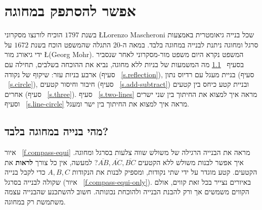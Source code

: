 


\chapter{אפשר להסתפק במחוגה}\label{c.compass}


בשנת
$1797$
הוכיח לורנצו מסקרוני 
\L{Lorenzo Mascheroni}
שכל בנייה גיאומטרית באמצעות סרגל ומחוגה ניתנת לבנייה במחוגה בלבד. במאה ה-20 התגלה שהמשפט הוכח בשנת
$1672$
על ידי גיאורג מור
\L{(Georg Mohr)}.
המשפט נקרא היום משפט מור-מסקרוני
לאחר שנסביר בסעיף%
~\ref{s.compass-what}
מה המשמעות של בניות ללא מחוגה, נביא את ההוכחה בשלבים, תחילה עם ארבע בניות עזר: שיקוף של נקודה (סעיף%
~\ref{s.reflection}),
בניית מעגל עם רדיוס נתון (סעיף%
~\ref{s.circle}),
חיבור וחיסור קטעים (סעיף%
~\ref{s.add-subtract})
ובניית קטע כיחס בין קטעים אחרים (סעיף%
~\ref{s.three}).
סעיף%
~\ref{s.two-lines}
מראה איך למצוא את החיתוך בין שני ישרים וסעיף%
~\ref{s.line-circle}
מראה איך למצוא את החיתוך בין ישר ומעגל.


\section{מהי בנייה במחוגה בלבד?}\label{s.compass-what}

איור%
~\ref{f.compass-equi}
מראה את הבנייה הרגילה של משולש שווה צלעות בסרגל ומחוגה. איך אפשר לבנות משולש ללא הקטעים
$\overline{AB},\overline{AC},\overline{BC}$?
למעשה, אין כל צורך
\textbf{לראות}
את הקטעים. קטע מוגדר על ידי שתי נקודות, ומספיק לבנות את הנקודות 
$A,B,C$
 כדי לקבל בנייה שקולה לבנייה בסרגל 
(איור%
~\ref{f.compass-equi-only}).
באיורים נצייר בכל זאת קווים, אולם הקווים משמשים אך ורק להבנת הבנייה ולהוכחת נכונותה. חשוב להשתכנע שהבנייה עצמה משתמשת רק במחוגה.


